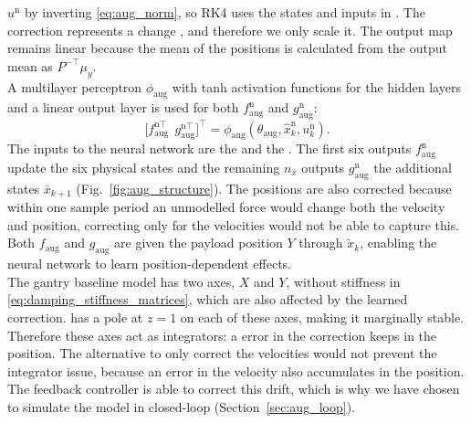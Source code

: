 $u^{\mathrm n}$ by inverting \eqref{eq:aug_norm}, so RK4 uses the
states and inputs in .
The correction represents a change , and therefore we only scale it.
The output map remains linear because the mean of the
positions is calculated from the output mean as
$P^{-\top}\mu_y$.
\\
A multilayer perceptron $\phi_{\mathrm{aug}}$ with tanh activation
functions for the hidden layers and a linear output layer is used
for both $f^{\mathrm n}_{\mathrm{aug}}$ and $g^{\mathrm n}_{\mathrm{aug}}$:
\[
\bigl[f^{\mathrm n\top}_{\mathrm{aug}}\;\,g^{\mathrm n\top}_{\mathrm{aug}}\bigr]^\top
=\phi_{\mathrm{aug}}(\theta_{\mathrm{aug}},\hat x^{\mathrm n}_k,u^{\mathrm n}_k).
\]
The inputs to the neural network are the 
and the .
The first six outputs $f^{\mathrm n}_{\mathrm{aug}}$ update the six
physical states and the remaining $n_{\bar x}$ outputs
$g^{\mathrm n}_{\mathrm{aug}}$ 
 the  additional states $\bar x_{k+1}$ (Fig.~\ref{fig:aug_structure}).
The positions are also corrected because within one sample period 
an unmodelled force would change both the velocity and position,
correcting only for the velocities would not be able to capture this.
Both $f_{\mathrm{aug}}$ and $g_{\mathrm{aug}}$ are given the payload 
position $Y$ through $\tilde x_k$, enabling the neural network to learn
 position-dependent effects.
\\
The gantry baseline model has two  axes, $X$ and $Y$, without stiffness
in \eqref{eq:damping_stiffness_matrices}, which are also
affected by the learned correction.
 has a pole at $z=1$ on each of these 
axes, making it marginally stable.
Therefore these axes act as integrators: a  error in the correction
keeps  in the position.
The alternative to only correct the velocities would not prevent the integrator 
issue, because an error in the velocity also accumulates in the position. 
The feedback controller is able to correct this drift, which is why we have 
chosen to simulate the model in closed-loop (Section~\ref{sec:aug_loop}).

